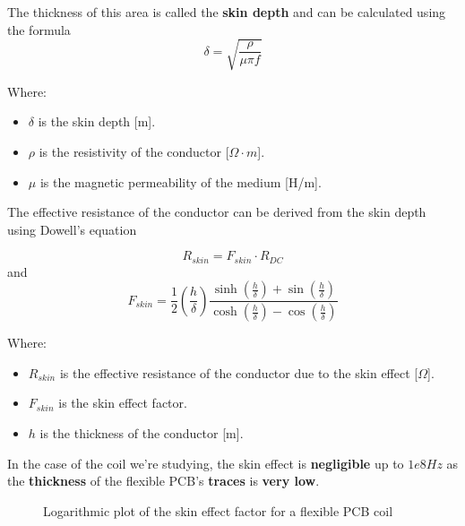 \begin{itemize}
    The thickness of this area is called the \textbf{skin depth} and can be calculated using the formula
    \begin{equation}
        \delta = \sqrt{\frac{\rho}{\mu \pi f}}
    \end{equation}
            
    Where:
    \begin{itemize}
        \item \( \delta \) is the skin depth [m].
        \item \( \rho \) is the resistivity of the conductor [\(\Omega \cdot m\)].
        \item \( \mu \) is the magnetic permeability of the medium [H/m].
    \end{itemize}
    
    \begin{samepage}
        The effective resistance of the conductor can be derived from the skin depth using Dowell's equation \cite{AC_res_coils}
        \nopagebreak

        \begin{equation}
            R_{skin} = F_{skin} \cdot R_{DC}
        \end{equation}
        and
        \begin{equation}
            F_{skin} = \frac{1}{2} (\frac{h}{\delta}) \frac{\sinh(\frac{h}{\delta}) + \sin(\frac{h}{\delta})}{\cosh(\frac{h}{\delta}) - \cos(\frac{h}{\delta})}
        \end{equation}

        Where:
        \begin{itemize}
            \item \( R_{skin} \) is the effective resistance of the conductor due to the skin effect [\(\Omega\)].
            \item \( F_{skin} \) is the skin effect factor.
            \item \( h \) is the thickness of the conductor [m].
        \end{itemize}
    \end{samepage}

    \begin{samepage}
        In the case of the coil we're studying, the skin effect is \textbf{negligible} up to $1e8 Hz$ as the \textbf{thickness} of the flexible PCB's \textbf{traces} is \textbf{very low}.
        \nopagebreak

        \begin{figure}[H]
            \centering
            
            \caption[Fskin of Flexar]{Logarithmic plot of the skin effect factor for a flexible PCB coil}
            \label{fig:Fskin of Flexar}
        \end{figure}
        \nopagebreak
    

\end{samepage}
\end{itemize}
